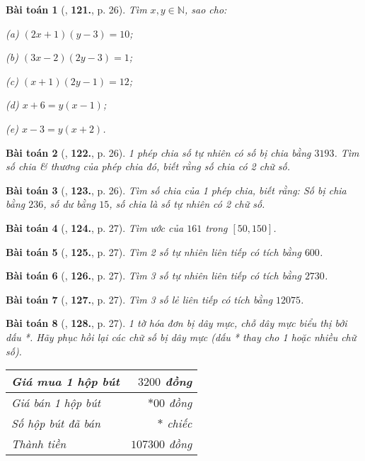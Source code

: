 \documentclass{article}
\numberwithin{equation}{section}
\newtheorem{baitoan}{Bài toán}[section]
\begin{document}
\begin{baitoan}[\cite{Binh_Toan_6_tap_1}, \textbf{121.}, p. 26]
	Tìm $x,y\in\mathbb{N}$, sao cho:
	\begin{enumerate*}
		\item[(a)] $(2x + 1)(y - 3) = 10$;
		\item[(b)] $(3x - 2)(2y - 3) = 1$;
		\item[(c)] $(x + 1)(2y - 1) = 12$;
		\item[(d)] $x + 6 = y(x - 1)$;
		\item[(e)] $x - 3 = y(x + 2)$.
	\end{enumerate*}
\end{baitoan}

\begin{baitoan}[\cite{Binh_Toan_6_tap_1}, \textbf{122.}, p. 26]
	1 phép chia số tự nhiên có số bị chia bằng $3193$. Tìm số chia \& thương của phép chia đó, biết rằng số chia có 2 chữ số.
\end{baitoan}

\begin{baitoan}[\cite{Binh_Toan_6_tap_1}, \textbf{123.}, p. 26]
	Tìm số chia của 1 phép chia, biết rằng: Số bị chia bằng $236$, số dư bằng $15$, số chia là số tự nhiên có 2 chữ số.
\end{baitoan}

\begin{baitoan}[\cite{Binh_Toan_6_tap_1}, \textbf{124.}, p. 27]
	Tìm ước của $161$ trong $[50,150]$.
\end{baitoan}

\begin{baitoan}[\cite{Binh_Toan_6_tap_1}, \textbf{125.}, p. 27]
	Tìm 2 số tự nhiên liên tiếp có tích bằng $600$.
\end{baitoan}

\begin{baitoan}[\cite{Binh_Toan_6_tap_1}, \textbf{126.}, p. 27]
	Tìm 3 số tự nhiên liên tiếp có tích bằng $2730$.
\end{baitoan}

\begin{baitoan}[\cite{Binh_Toan_6_tap_1}, \textbf{127.}, p. 27]
	Tìm 3 số lẻ liên tiếp có tích bằng $12075$.
\end{baitoan}

\begin{baitoan}[\cite{Binh_Toan_6_tap_1}, \textbf{128.}, p. 27]
	1 tờ hóa đơn bị dây mực, chỗ dây mực biểu thị bởi dấu *. Hãy phục hồi lại các chữ số bị dây mực (dấu * thay cho 1 hoặc nhiều chữ số).
	\begin{table}[H]
		\centering
		\begin{tabular}{|l|r|}
			\hline
			Giá mua 1 hộp bút & $3200$ đồng \\
			\hline
			Giá bán 1 hộp bút & $*00$ đồng \\
			\hline
			Số hộp bút đã bán & $*$ chiếc \\
			\hline
			\textit{Thành tiền} & $107300$ đồng \\
			\hline
		\end{tabular}
	\end{table}
\end{baitoan}
\end{document}
